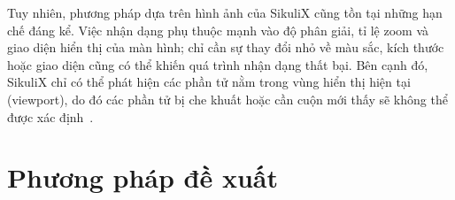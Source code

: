 \documentclass[a4paper, 12pt]{report}
\begin{document}
Tuy nhiên, phương pháp dựa trên hình ảnh của SikuliX cũng tồn tại những hạn chế đáng kể. Việc nhận dạng phụ thuộc mạnh vào độ phân giải, tỉ lệ zoom và giao diện hiển thị của màn hình; chỉ cần sự thay đổi nhỏ về màu sắc, kích thước hoặc giao diện cũng có thể khiến quá trình nhận dạng thất bại. Bên cạnh đó, SikuliX chỉ có thể phát hiện các phần tử nằm trong vùng hiển thị hiện tại (viewport), do đó các phần tử bị che khuất hoặc cần cuộn mới thấy sẽ không thể được xác định~\cite{22}.






\chapter{Phương pháp đề xuất}
\end{document}
